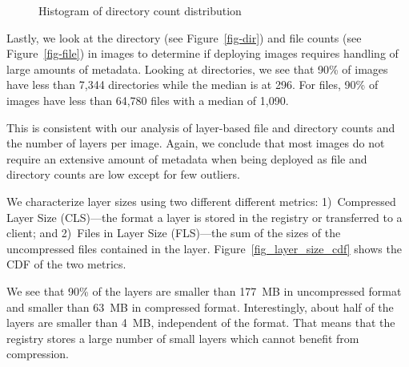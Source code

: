\begin{figure}[!t]
	\centering
	\caption{Histogram of directory count distribution}
	\label{fig:reference-cnt}
\end{figure}

Lastly, we look at the directory (see Figure~\ref{fig-dir}) and file counts
(see Figure~\ref{fig-file}) in images to determine if deploying
images requires handling of large amounts of metadata. Looking at directories,
we see that 90\% of images have less than 7,344 directories while the median
is at 296. For files, 90\% of images have less than 64,780 files with a median
of 1,090.

This is consistent with our analysis of layer-based file and directory counts
and the number of layers per image. Again, we conclude that most images
do not require an extensive amount of metadata when being deployed as file and
directory counts are low except for few outliers.

We characterize layer sizes using two different different metrics:
%
1)~Compressed Layer Size (CLS)---the format a layer is stored in the registry or
transferred to a client;
%
%
and 2)~Files in Layer Size (FLS)---the sum of the sizes of the uncompressed files contained
in the layer.
%
Figure~\ref{fig_layer_size_cdf} shows the CDF of the two metrics.


We see that 90\% of the layers are smaller than 177~MB in uncompressed 
format and smaller than 63~MB in compressed format.
%
Interestingly, about half of the layers are smaller than 4~MB, independent
of the format. That means that the registry stores a large number of
small layers which cannot benefit from compression.

